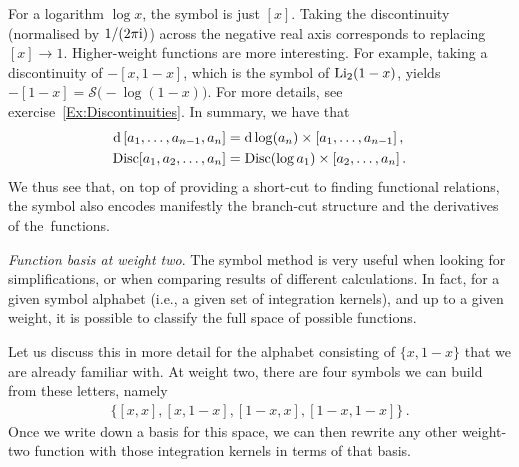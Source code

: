 For a logarithm $\log x$, the symbol is just $[x]$. Taking the discontinuity (normalised by $1/(2 \pi \mathrm{i})$) across the negative real axis corresponds to replacing $[x] \to 1$.
Higher-weight functions are more interesting. For example, taking a discontinuity of $-[x,1-x]$, which is the symbol of ${\rm Li}_{2}(1-x)$, yields $-[1-x] = {\mathcal S}\bigl(- \log (1-x) \bigr)$.
For more details, see exercise~\ref{Ex:Discontinuities}.
In summary, we have that
\begin{align} \begin{aligned}
\mathrm{d} \, [a_1,\ldots,a_{n-1},a_n] & = \mathrm{d} \log(a_n) \times [a_1,\ldots,a_{n-1}] \,, \\
\mathrm{Disc} [a_1,a_2,\ldots,a_n] & = \mathrm{Disc}(\log a_1) \times [a_2,\ldots,a_n] \,.
\end{aligned} \end{align}
We thus see that, on top of providing a short-cut to finding functional relations, the symbol also encodes manifestly the branch-cut structure and the derivatives of the~functions.

\smallskip

{\it Function basis at weight two}. 
The symbol method is very useful when looking for simplifications, or when comparing results of different calculations.
In fact, for a given symbol alphabet (i.e., a given set of integration kernels), and up to a given weight, it is possible to classify the full space of possible functions.

Let us discuss this in more detail for the alphabet consisting of $\{x, 1-x \}$ that we are already familiar with. At weight two, there are four symbols we can build from these letters, namely 
\begin{align}\label{eq:symbolbasisweight2}
\bigl\{ [x,x] , [x,1-x], [1-x,x], [1-x,1-x] \bigr\} \,.
\end{align}
Once we write down a basis for this space, we can then rewrite any other weight-two function with those integration kernels in terms of that basis. 


